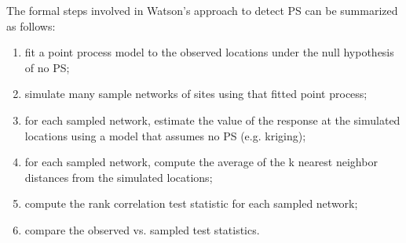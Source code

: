 \documentclass{article}
\begin{document}


The formal steps involved in  Watson's approach \cite{watson2020} to detect \ac{PS} can be summarized as follows:
\begin{enumerate}
    \item fit a point process model to the observed locations under the null hypothesis of no \ac{PS};
    \item simulate many sample networks of sites using that fitted point process;
    \item for each sampled network, estimate the value of the response at the simulated locations using a model that assumes no PS (e.g. kriging); 
    \item for each sampled network, compute the average of the \gls{k} nearest neighbor distances from the simulated locations; 
    \item compute the rank correlation test statistic for each sampled network;
    \item compare the observed vs. sampled test statistics.
\end{enumerate}




\end{document}
